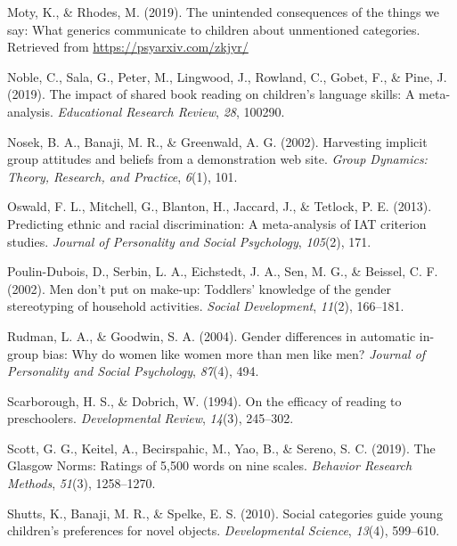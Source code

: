 \documentclass[
  english,
  ,man,floatsintext]{apa6}
\begin{document}
\leavevmode\hypertarget{ref-moty2019unintended}{}%
Moty, K., \& Rhodes, M. (2019). The unintended consequences of the things we say: What generics communicate to children about unmentioned categories. Retrieved from \url{https://psyarxiv.com/zkjyr/}

\leavevmode\hypertarget{ref-noble2019impact}{}%
Noble, C., Sala, G., Peter, M., Lingwood, J., Rowland, C., Gobet, F., \& Pine, J. (2019). The impact of shared book reading on children's language skills: A meta-analysis. \emph{Educational Research Review}, \emph{28}, 100290.

\leavevmode\hypertarget{ref-nosek2002harvesting}{}%
Nosek, B. A., Banaji, M. R., \& Greenwald, A. G. (2002). Harvesting implicit group attitudes and beliefs from a demonstration web site. \emph{Group Dynamics: Theory, Research, and Practice}, \emph{6}(1), 101.

\leavevmode\hypertarget{ref-oswald2013predicting}{}%
Oswald, F. L., Mitchell, G., Blanton, H., Jaccard, J., \& Tetlock, P. E. (2013). Predicting ethnic and racial discrimination: A meta-analysis of IAT criterion studies. \emph{Journal of Personality and Social Psychology}, \emph{105}(2), 171.

\leavevmode\hypertarget{ref-poulin2002men}{}%
Poulin-Dubois, D., Serbin, L. A., Eichstedt, J. A., Sen, M. G., \& Beissel, C. F. (2002). Men don't put on make-up: Toddlers' knowledge of the gender stereotyping of household activities. \emph{Social Development}, \emph{11}(2), 166--181.

\leavevmode\hypertarget{ref-rudman2004gender}{}%
Rudman, L. A., \& Goodwin, S. A. (2004). Gender differences in automatic in-group bias: Why do women like women more than men like men? \emph{Journal of Personality and Social Psychology}, \emph{87}(4), 494.

\leavevmode\hypertarget{ref-scarborough1994efficacy}{}%
Scarborough, H. S., \& Dobrich, W. (1994). On the efficacy of reading to preschoolers. \emph{Developmental Review}, \emph{14}(3), 245--302.

\leavevmode\hypertarget{ref-scott2019glasgow}{}%
Scott, G. G., Keitel, A., Becirspahic, M., Yao, B., \& Sereno, S. C. (2019). The Glasgow Norms: Ratings of 5,500 words on nine scales. \emph{Behavior Research Methods}, \emph{51}(3), 1258--1270.

\leavevmode\hypertarget{ref-shutts2010social}{}%
Shutts, K., Banaji, M. R., \& Spelke, E. S. (2010). Social categories guide young children's preferences for novel objects. \emph{Developmental Science}, \emph{13}(4), 599--610.
\end{document}
